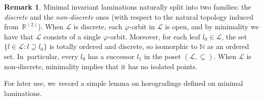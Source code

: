 \documentclass[JEP,XML,SOM,Unicode,NoFloatCountersInSection,published]{cedram}
\theoremstyle{definition}
\newtheorem{rem}[thm]{Remark}
\newcommand{\R}{\mathbb{R}}
\newcommand{\N}{\mathbb N}
\newcommand{\Lcal}{\mathcal{L}}
\begin{document}
\begin{rem}\label{r-discrete-minimal}
Minimal invariant laminations naturally split into two families: the \emph{discrete} and the \emph{non-discrete} ones (with respect to the natural topology induced from~$\R^{(2)}$).
When $\Lcal$ is discrete, each $\varphi$-orbit in $\Lcal$ is open, and by minimality we have that $\Lcal$ consists of a single $\varphi$-orbit. Moreover, for each leaf $l_0\in \Lcal$, the set $\{l\in \Lcal : l\supseteq l_0\}$ is totally ordered and discrete, so isomorphic to $\N$ as an ordered set. In~particular, every $l_0$ has a successor $l_1$ in the poset $(\Lcal, \subseteq)$.
When $\Lcal$ is non-discrete, minimality implies that it has no isolated points.\end{rem}

For later use, we~record a simple lemma on horogradings defined on minimal laminations.
\end{document}
